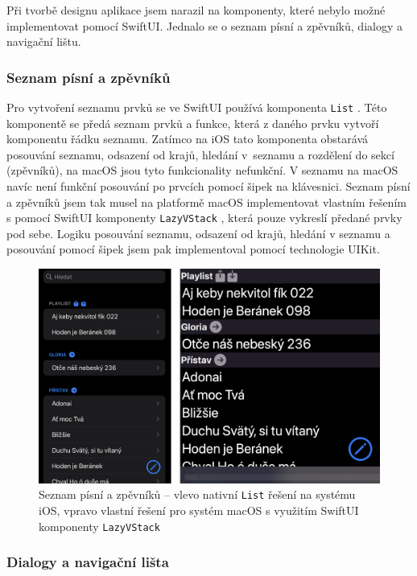 Při tvorbě designu aplikace jsem narazil na komponenty, které nebylo možné implementovat pomocí SwiftUI. Jednalo se o seznam písní a zpěvníků, dialogy a navigační lištu.

\subsubsection{Seznam písní a zpěvníků}

Pro vytvoření seznamu prvků se ve SwiftUI používá komponenta \texttt{List} \cite{swiftui-list}. Této komponentě se předá seznam prvků a funkce, která z daného prvku vytvoří komponentu řádku seznamu. Zatímco na iOS tato komponenta obstarává posouvání seznamu, odsazení od krajů, hledání v~seznamu a rozdělení do sekcí (zpěvníků), na macOS jsou tyto funkcionality nefunkční. V seznamu na macOS navíc není funkční posouvání po prvcích pomocí šipek na klávesnici. Seznam písní a zpěvníků jsem tak musel na platformě macOS implementovat vlastním řešením s pomocí SwiftUI komponenty \texttt{LazyVStack} \cite{swiftui-lazyvstack}, která pouze vykreslí předané prvky pod sebe. Logiku posouvání seznamu, odsazení od krajů, hledání v seznamu a posouvání pomocí šipek jsem pak implementoval pomocí technologie UIKit.

\begin{figure}[H]
    \includegraphics[width=\textwidth]{images/5-implementace/5-1-seznam-zpevniku.png}
    \caption[Seznam písní a zpěvníků -- rozdíl mezi iOS a macOS]{Seznam písní a zpěvníků -- vlevo nativní \texttt{List} řešení na systému iOS, vpravo vlastní řešení pro systém macOS s využitím SwiftUI komponenty \texttt{LazyVStack}}
\end{figure}

\subsubsection{Dialogy a navigační lišta}

